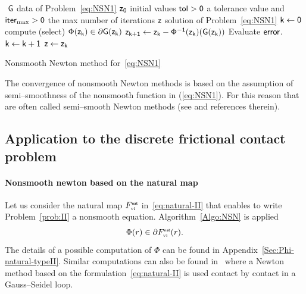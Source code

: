 {\begin{algorithm}
  \begin{algorithmic}
    {\sf
      \STATE $ $
      \REQUIRE $\sf G $ data of Problem~\eqref{eq:NSN1}
      \REQUIRE $\sf z_0$ initial values
      \REQUIRE $\sf tol >0$ a tolerance value and $\sf iter_{\max}  >0$ the max number of iterations
      \ENSURE  $\sf z$ solution of Problem~\eqref{eq:NSN1}
      \STATE   $\sf k \leftarrow 0$ 
      \STATE compute (select) $\sf \Phi(z_k) \in \partial G(z_k)$
      \STATE $\sf z_{k+1} \leftarrow   z_k -  \Phi^{-1}(z_k) (G(z_k))$
      \STATE Evaluate $\sf error$.
      \STATE $\sf k \leftarrow k+1$
      \ENDWHILE
      \STATE $\sf z \leftarrow z_{k}$ 
    }
  \end{algorithmic}
  \caption{Nonsmooth Newton method for~\eqref{eq:NSN1}}  \label{Algo:NSN}
\end{algorithm}

The convergence of nonsmooth Newton methods is based on the assumption of semi--smoothness of the nonsmooth function in (\ref{eq:NSN1}). For this reason that are often called semi--smooth Newton methods  (see \citep[Section 7.5]{Facchinei.Pang2003} and references therein).
\subsection{Application to  the discrete frictional contact problem}

\paragraph{Nonsmooth newton based on the natural map }
Let us consider the natural map $F_{{\hbox{\tiny{vi}}}}^{\hbox{\sf \tiny{nat}}}$ in~\eqref{eq:natural-II} that enables to write Problem~\ref{prob:II}  a nonsmooth equation.
Algorithm~\ref{Algo:NSN} is applied 
\begin{equation}  \label{eq:phiphi}
    \Phi(r) \in \partial F_{\vitwo}^\nat(r).
\end{equation}
 The details of a possible computation of $\Phi$ can be found in Appendix~\ref{Sec:Phi-natural-typeII}.  Similar computations can also be found in~\cite{Joli.Feng2008} where a Newton method based on the formulation~\eqref{eq:natural-II} is used contact by contact in a Gauss--Seidel loop.


}
